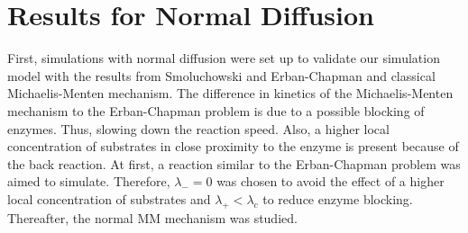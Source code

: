 \documentclass[
  a4paper,BCOR10mm,twoside,
  headsepline,footsepline,%
  fleqn,openbib
]{scrbook}
\begin{document}
\section{Results for Normal Diffusion}
First, simulations with normal diffusion were set up to validate our simulation model  with the results from Smoluchowski \cite{vonSmoluchowski1906} and Erban-Chapman \cite{Erban2009} and classical Michaelis-Menten mechanism. The difference in kinetics of the Michaelis-Menten mechanism to the Erban-Chapman problem is due to a possible blocking of enzymes. Thus, slowing down the reaction speed. Also, a higher local concentration of substrates in close proximity to the enzyme is present because of the back reaction. At first, a reaction similar to the Erban-Chapman problem was aimed to simulate. Therefore,  $\lambda_-=0 $  was chosen to avoid the effect of a higher local concentration of substrates and $\lambda_+ < \lambda_c$ to reduce enzyme blocking. Thereafter, the normal MM mechanism was studied. 
\end{document}

